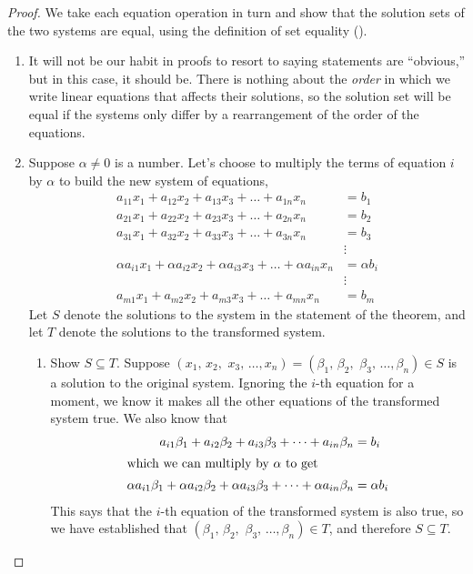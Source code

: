 \begin{proof}
%
We take each equation operation in turn and show that the solution sets of the two systems are equal, using the definition of set equality ().
%
\begin{enumerate}
\item  It will not be our habit in proofs to resort to saying statements are ``obvious,'' but in this case, it should be.  There is nothing about the {\em order} in which we write linear equations that affects their solutions, so the solution set will be equal if the systems only differ by a rearrangement of the order of the equations.
\item  Suppose $\alpha\neq 0$ is a number.  Let's choose to multiply the terms of equation $i$ by $\alpha$ to build the new system of equations,
%
\begin{align*}
a_{11}x_1+a_{12}x_2+a_{13}x_3+\dots+a_{1n}x_n&=b_1\\
a_{21}x_1+a_{22}x_2+a_{23}x_3+\dots+a_{2n}x_n&=b_2\\
a_{31}x_1+a_{32}x_2+a_{33}x_3+\dots+a_{3n}x_n&=b_3\\
&\vdots\\
\alpha a_{i1}x_1+\alpha a_{i2}x_2+\alpha a_{i3}x_3+\dots+\alpha a_{in}x_n&=\alpha b_i\\
&\vdots\\
a_{m1}x_1+a_{m2}x_2+a_{m3}x_3+\dots+a_{mn}x_n&=b_m
\end{align*}
%
Let $S$ denote the solutions to the system in the statement of the theorem, and let $T$ denote the solutions to the transformed system.
\begin{enumerate}
%
\item Show $S\subseteq T$.  Suppose $(x_1,\,x_2,\,\,x_3,\,\ldots,x_n)=(\beta_1,\,\beta_2,\,\,\beta_3,\,\ldots,\beta_n)\in S$ is a solution to the original system.  Ignoring the $i$-th equation for a moment, we know it makes all the other equations of the transformed system true.  We also know that
%
\begin{align*}
a_{i1}\beta_1+a_{i2}\beta_2+a_{i3}\beta_3+\dots+a_{in}\beta_n&=b_i\\
\intertext{which we can multiply by $\alpha$ to get}
\alpha a_{i1}\beta_1+\alpha a_{i2}\beta_2+\alpha a_{i3}\beta_3+\dots+\alpha a_{in}\beta_n&=\alpha b_i
\end{align*}
%
This says that the $i$-th equation of the transformed system is also true, so we have established that $(\beta_1,\,\beta_2,\,\,\beta_3,\,\ldots,\beta_n)\in T$, and therefore $S\subseteq T$.

\end{enumerate}
\end{enumerate}
\end{proof}
